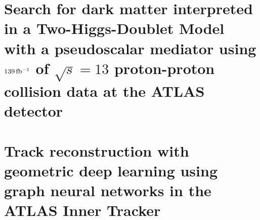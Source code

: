 \documentclass[12pt]{withesis}
\begin{document}

% 
\setcounter{page}{0}
% 
% 
% 

\tableofcontents
\cleardoublepage
{} %
\listoffigures
\cleardoublepage
{} %
\listoftables


\setlength{\parskip}{1em}


\part{Search for dark matter interpreted in a Two-Higgs-Doublet Model with a pseudoscalar mediator using $139\, \mbox{fb\(^{-1}\)}$ of $\sqrt{s}=13$ \TeV proton-proton collision data at the ATLAS detector}





\part{Track reconstruction with geometric deep learning using graph neural networks in the ATLAS Inner Tracker}



% 



% 
% 

% 
% 


% 
% 
% 
% 

% 
% 

% 
\end{document}
